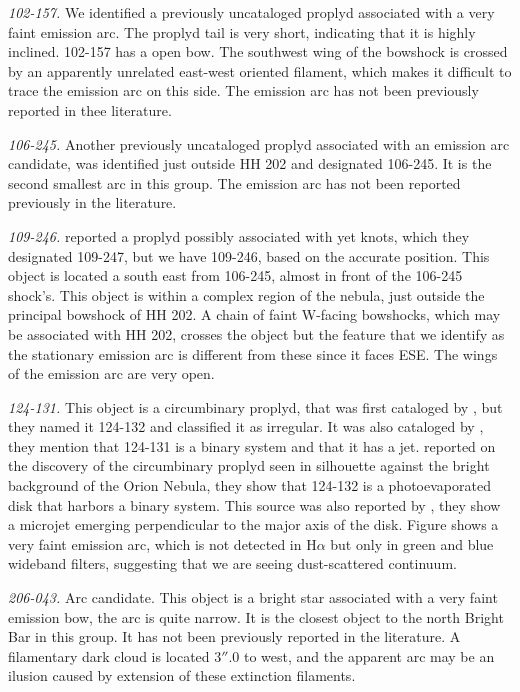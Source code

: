 \documentclass{article}
\newcommand\ha{\ensuremath{\mathrm{H}\alpha}}
\begin{document}
\textit{102-157.} We identified a previously uncataloged proplyd associated with a very faint emission arc. The proplyd tail is very short, indicating that it is highly inclined. 102-157 has a open bow. The southwest wing of the bowshock is crossed by an apparently unrelated east-west oriented filament, which makes it difficult to trace the emission arc on this side. The emission arc has not been previously reported in thee literature. 

\textit{106-245.} Another previously uncataloged proplyd associated with an emission arc candidate, was identified just outside HH 202 and designated 106-245. It is the second smallest arc in this group. The emission arc has not been reported previously in the literature. 

\textit{109-246.} \citet{Bally:2000a} reported a proplyd possibly associated with yet knots, which they designated 109-247, but we have 109-246, based on the accurate position. This object is located a south east from 106-245, almost in front of the 106-245 shock's. This object is within a complex region of the nebula, just outside the principal bowshock of HH 202. A chain of faint W-facing bowshocks, which may be associated with HH 202, crosses the object but the feature that we identify as the stationary emission arc is different from these since it faces ESE. The wings of the emission arc are very open.    

\textit{124-131.} This object is a circumbinary proplyd, that  was first cataloged by \citet{Odell:1996}, but they named it 124-132 and classified it as irregular. It was also cataloged by \citet{Ricci:2008}, they mention that 124-131 is a binary system and that it has a jet. \citet{Robberto:2008} reported on the discovery of the circumbinary proplyd seen in silhouette against the bright background of the Orion Nebula, they show that 124-132 is a photoevaporated disk that harbors a binary system. This source was also reported by \citet{Smith:2005a}, they show a microjet emerging perpendicular to the major axis of the disk. Figure shows a very faint emission arc, which is not detected in \ha{} but only in green and blue wideband filters, suggesting that we are seeing dust-scattered continuum.
 
\textit{206-043.} Arc candidate. This object is a bright star associated with a very faint emission bow, the arc is quite narrow. It is the  closest object to the north Bright Bar in this group. It has not been previously reported in the literature. A filamentary dark cloud is located \(3''.0\) to west, and the apparent arc may be an ilusion caused by extension of these extinction filaments.
\end{document}
